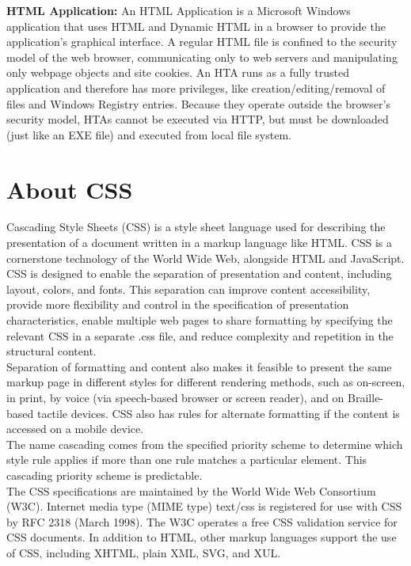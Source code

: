 \documentclass[12pt,a4 paper]{report}
\begin{document}
\noindent \textbf{HTML Application:}
An HTML Application is a Microsoft Windows application that uses HTML and Dynamic HTML in a browser to provide the application's graphical interface. A regular HTML file is confined to the security model of the web browser, communicating only to web servers and manipulating only webpage objects and site cookies. An HTA runs as a fully trusted application and therefore has more privileges, like creation/editing/removal of files and Windows Registry entries. Because they operate outside the browser's security model, HTAs cannot be executed via HTTP, but must be downloaded (just like an EXE file) and executed from local file system.

\section{About CSS}
Cascading Style Sheets (CSS) is a style sheet language used for describing the presentation of a document written in a markup language like HTML. CSS is a cornerstone technology of the World Wide Web, alongside HTML and JavaScript. \\

CSS is designed to enable the separation of presentation and content, including layout, colors, and fonts. This separation can improve content accessibility, provide more flexibility and control in the specification of presentation characteristics, enable multiple web pages to share formatting by specifying the relevant CSS in a separate .css file, and reduce complexity and repetition in the structural content. \\

Separation of formatting and content also makes it feasible to present the same markup page in different styles for different rendering methods, such as on-screen, in print, by voice (via speech-based browser or screen reader), and on Braille-based tactile devices. CSS also has rules for alternate formatting if the content is accessed on a mobile device. \\

The name cascading comes from the specified priority scheme to determine which style rule applies if more than one rule matches a particular element. This cascading priority scheme is predictable. \\

The CSS specifications are maintained by the World Wide Web Consortium (W3C). Internet media type (MIME type) text/css is registered for use with CSS by RFC 2318 (March 1998). The W3C operates a free CSS validation service for CSS documents. In addition to HTML, other markup languages support the use of CSS, including XHTML, plain XML, SVG, and XUL.
\end{document}
